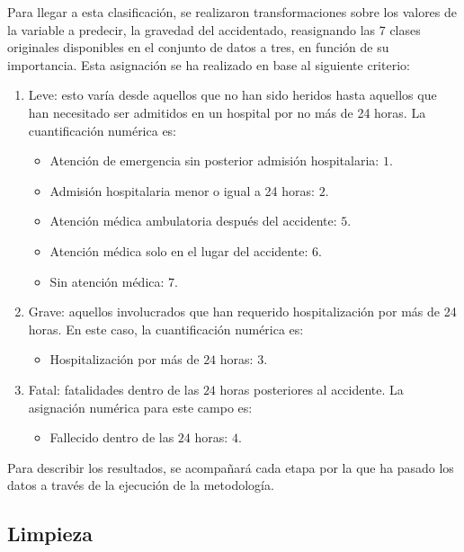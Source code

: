 Para llegar a esta clasificación, se realizaron transformaciones sobre los valores de la variable a predecir, la gravedad del accidentado, reasignando las 7 clases originales disponibles en el conjunto de datos a tres, en función de su importancia. Esta asignación se ha realizado en base al siguiente criterio:

\begin{enumerate}
	\item Leve: esto varía desde aquellos que no han sido heridos hasta aquellos que han necesitado ser admitidos en un hospital por no más de 24 horas. La cuantificación numérica es:
	\begin{itemize}
		\item Atención de emergencia sin posterior admisión hospitalaria: $1$.
		\item Admisión hospitalaria menor o igual a 24 horas: $2$.
		\item Atención médica ambulatoria después del accidente: $5$.
		\item Atención médica solo en el lugar del accidente: $6$.
		\item Sin atención médica: $7$.
	\end{itemize}
	\item Grave: aquellos involucrados que han requerido hospitalización por más de 24 horas. En este caso, la cuantificación numérica es:
	\begin{itemize}
		\item Hospitalización por más de $24$ horas: $3$.
	\end{itemize}
	\item Fatal: fatalidades dentro de las $24$ horas posteriores al accidente. La asignación numérica para este campo es:
	\begin{itemize}
		\item Fallecido dentro de las $24$ horas: $4$.
	\end{itemize}
\end{enumerate}

Para describir los resultados, se acompañará cada etapa por la que ha pasado los datos a través de la ejecución de la metodología.

\subsection*{Limpieza}


